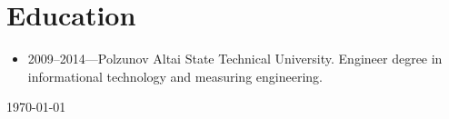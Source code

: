 \documentclass[a4paper,12pt]{article}
\begin{document}
\section*{Education}

\begin{itemize}[noitemsep]
\item 2009--2014---Polzunov Altai State Technical University. Engineer
  degree in informational technology and measuring engineering.
\end{itemize}

\begin{flushright}
  \today
\end{flushright}
\end{document}
